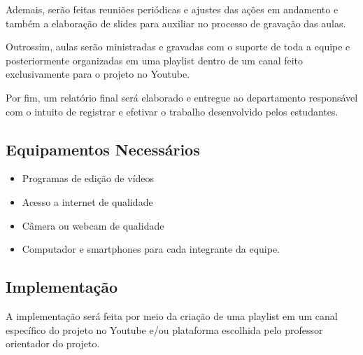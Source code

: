\documentclass[a4paper,10pt]{article} %
\begin{document}
 Ademais,  serão feitas reuniões periódicas e ajustes das ações em andamento e também  a elaboração de slides para auxiliar no processo de gravação das aulas.
 
 Outrossim, aulas serão ministradas e gravadas com o suporte de toda a  equipe e posteriormente organizadas em uma playlist dentro de um canal feito exclusivamente para o projeto no Youtube.
 
 Por fim, um relatório final será elaborado e entregue ao departamento responsável com o intuito de registrar e efetivar o trabalho desenvolvido pelos estudantes.

\subsection{Equipamentos Necessários}

\begin{itemize}
 \item Programas de edição de vídeos 
 \item Acesso a internet de qualidade
 \item Câmera ou webcam de qualidade
 \item Computador e smartphones para cada integrante da equipe.
\end{itemize}

\subsection{Implementação}
 A implementação será feita por meio da criação de uma playlist em um canal específico do projeto no Youtube e/ou plataforma escolhida pelo professor orientador do projeto.

\end{document}
